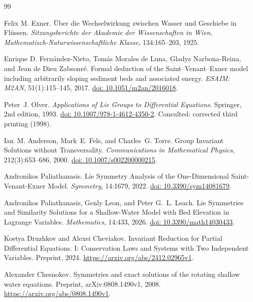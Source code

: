 \documentclass[12pt,a4paper,oneside]{report}
\numberwithin{equation}{chapter}
\theoremstyle{remark}\newtheorem{remark}[theorem]{Remark}
\newcommand{\doi}[1]{\href{https://doi.org/#1}{doi: #1}}
\begin{document}
\clearpage
\begingroup
\small
\raggedright
{}
\setlength{\bibsep}{1pt plus .3pt minus .3pt}
\begin{thebibliography}{99}
Felix M. Exner. \"Uber die Wechselwirkung zwischen Wasser und Geschiebe in Fl\"ussen. \emph{Sitzungsberichte der Akademie der Wissenschaften in Wien, Mathematisch-Naturwissenschaftliche Klasse}, 134:165--203, 1925.

Enrique D. Fern\'andez-Nieto, Tom\'as Morales de Luna, Gladys Narbona-Reina, and Jean de Dieu Zabsonr\'e. Formal deduction of the Saint--Venant--Exner model including arbitrarily sloping sediment beds and associated energy. \emph{ESAIM: M2AN}, 51(1):115--145, 2017. \doi{10.1051/m2an/2016018}.

Peter~J. Olver. \emph{Applications of Lie Groups to Differential Equations}. Springer, 2nd edition, 1993. \doi{10.1007/978-1-4612-4350-2}. Consulted: corrected third printing (1998).

Ian~M. Anderson, Mark~E. Fels, and Charles~G. Torre. Group Invariant Solutions without Transversality. \emph{Communications in Mathematical Physics}, 212(3):653--686, 2000. \doi{10.1007/s002200000215}.

Andronikos Paliathanasis. Lie Symmetry Analysis of the One-Dimensional Saint-Venant-Exner Model. \emph{Symmetry}, 14:1679, 2022. \doi{10.3390/sym14081679}.

Andronikos Paliathanasis, Genly Leon, and Peter G.~L. Leach. Lie Symmetries and Similarity Solutions for a Shallow-Water Model with Bed Elevation in Lagrange Variables. \emph{Mathematics}, 14:433, 2026. \doi{10.3390/math14030433}.

Kostya Druzhkov and Alexei Cheviakov. Invariant Reduction for Partial Differential Equations. I: Conservation Laws and Systems with Two Independent Variables. Preprint, 2024. \url{https://arxiv.org/abs/2412.02965v1}.

Alexander Chesnokov. Symmetries and exact solutions of the rotating shallow water equations.
Preprint, arXiv:0808.1490v1, 2008. \url{https://arxiv.org/abs/0808.1490v1}.


\end{thebibliography}
\end{document}
